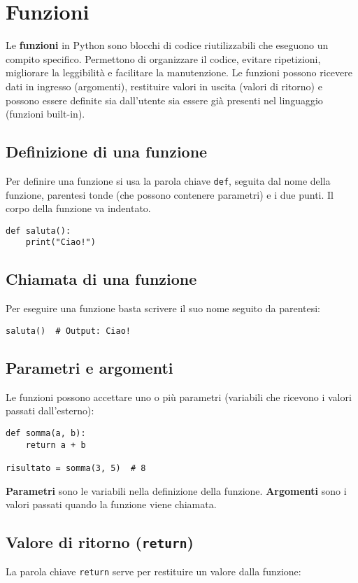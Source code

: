 \documentclass[a4paper,12pt]{article}
\begin{document}
\section{Funzioni}
Le \textbf{funzioni} in Python sono blocchi di codice riutilizzabili che eseguono un compito specifico. Permettono di organizzare il codice, evitare ripetizioni, migliorare la leggibilità e facilitare la manutenzione. Le funzioni possono ricevere dati in ingresso (argomenti), restituire valori in uscita (valori di ritorno) e possono essere definite sia dall’utente sia essere già presenti nel linguaggio (funzioni built-in).

\subsection*{Definizione di una funzione}
Per definire una funzione si usa la parola chiave \texttt{def}, seguita dal nome della funzione, parentesi tonde (che possono contenere parametri) e i due punti. Il corpo della funzione va indentato.

\begin{lstlisting}
def saluta():
    print("Ciao!")
\end{lstlisting}

\subsection*{Chiamata di una funzione}
Per eseguire una funzione basta scrivere il suo nome seguito da parentesi:

\begin{lstlisting}
saluta()  # Output: Ciao!
\end{lstlisting}

\subsection*{Parametri e argomenti}
Le funzioni possono accettare uno o più parametri (variabili che ricevono i valori passati dall’esterno):

\begin{lstlisting}
def somma(a, b):
    return a + b

risultato = somma(3, 5)  # 8
\end{lstlisting}

\textbf{Parametri} sono le variabili nella definizione della funzione. \textbf{Argomenti} sono i valori passati quando la funzione viene chiamata.

\subsection*{Valore di ritorno (\texttt{return})}
La parola chiave \texttt{return} serve per restituire un valore dalla funzione:
\end{document}
